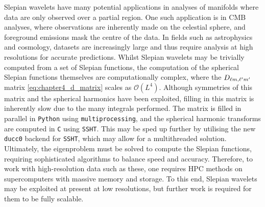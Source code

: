 Slepian wavelets have many potential applications in analyses of manifolds where data are only observed over a partial region.
One such application is in CMB analyses, where observations are inherently made on the celestial sphere, and foreground emissions mask the centre of the data.
In fields such as astrophysics and cosmology, datasets are increasingly large and thus require analysis at high resolutions for accurate predictions.
Whilst Slepian wavelets may be trivially computed from a set of Slepian functions, the computation of the spherical Slepian functions themselves are computationally complex, where the \(D_{\ell{} m,\ell' m'}{}\) matrix \cref{eq:chapter4_d_matrix} scales as \(\mathcal{O}(L^{4})\).
Although symmetries of this matrix and the spherical harmonics have been exploited, filling in this matrix is inherently slow due to the many integrals performed.
The matrix is filled in parallel in \texttt{Python} using \texttt{multiprocessing}, and the spherical harmonic transforms are computed in \texttt{C} using \texttt{SSHT}.
This may be sped up further by utilising the new \texttt{ducc0} backend for \texttt{SSHT}, which may allow for a multithreaded solution.
Ultimately, the eigenproblem must be solved to compute the Slepian functions, requiring sophisticated algorithms to balance speed and accuracy.
Therefore, to work with high-resolution data such as these, one requires HPC methods on supercomputers with massive memory and storage.
To this end, Slepian wavelets may be exploited at present at low resolutions, but further work is required for them to be fully scalable.

